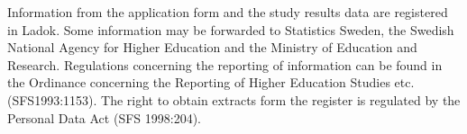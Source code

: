 Information from the application form and the study results data are registered in Ladok. Some information may be forwarded to Statistics Sweden, the Swedish National Agency for Higher Education and the Ministry of Education and Research. Regulations concerning the reporting of information can be found in the Ordinance concerning the Reporting of Higher Education Studies etc. (SFS1993:1153). The right to obtain extracts form the register is regulated by the Personal Data Act (SFS 1998:204).

